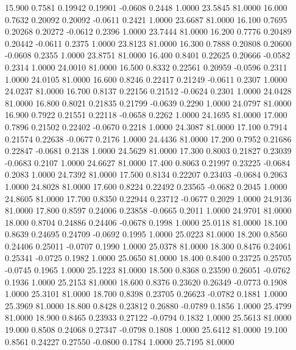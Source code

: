   15.900   0.7581   0.19942   0.19901  -0.0608   0.2448   1.0000  23.5845  81.0000
  16.000   0.7632   0.20092   0.20092  -0.0611   0.2421   1.0000  23.6687  81.0000
  16.100   0.7695   0.20268   0.20272  -0.0612   0.2396   1.0000  23.7444  81.0000
  16.200   0.7776   0.20489   0.20442  -0.0611   0.2375   1.0000  23.8123  81.0000
  16.300   0.7888   0.20808   0.20600  -0.0608   0.2355   1.0000  23.8751  81.0000
  16.400   0.8401   0.22625   0.20666  -0.0582   0.2314   1.0000  24.0010  81.0000
  16.500   0.8332   0.22561   0.20959  -0.0596   0.2311   1.0000  24.0105  81.0000
  16.600   0.8246   0.22417   0.21249  -0.0611   0.2307   1.0000  24.0237  81.0000
  16.700   0.8137   0.22156   0.21512  -0.0624   0.2301   1.0000  24.0428  81.0000
  16.800   0.8021   0.21835   0.21799  -0.0639   0.2290   1.0000  24.0797  81.0000
  16.900   0.7922   0.21551   0.22118  -0.0658   0.2262   1.0000  24.1695  81.0000
  17.000   0.7896   0.21502   0.22402  -0.0670   0.2218   1.0000  24.3087  81.0000
  17.100   0.7914   0.21574   0.22638  -0.0677   0.2176   1.0000  24.4436  81.0000
  17.200   0.7952   0.21686   0.22847  -0.0681   0.2138   1.0000  24.5629  81.0000
  17.300   0.8003   0.21827   0.23039  -0.0683   0.2107   1.0000  24.6627  81.0000
  17.400   0.8063   0.21997   0.23225  -0.0684   0.2083   1.0000  24.7392  81.0000
  17.500   0.8134   0.22207   0.23403  -0.0684   0.2063   1.0000  24.8028  81.0000
  17.600   0.8224   0.22492   0.23565  -0.0682   0.2045   1.0000  24.8605  81.0000
  17.700   0.8350   0.22944   0.23712  -0.0677   0.2029   1.0000  24.9136  81.0000
  17.800   0.8597   0.24006   0.23858  -0.0665   0.2011   1.0000  24.9701  81.0000
  18.000   0.8704   0.24886   0.24406  -0.0678   0.1998   1.0000  25.0118  81.0000
  18.100   0.8639   0.24695   0.24709  -0.0692   0.1995   1.0000  25.0223  81.0000
  18.200   0.8560   0.24406   0.25011  -0.0707   0.1990   1.0000  25.0378  81.0000
  18.300   0.8476   0.24061   0.25341  -0.0725   0.1982   1.0000  25.0650  81.0000
  18.400   0.8400   0.23725   0.25705  -0.0745   0.1965   1.0000  25.1223  81.0000
  18.500   0.8368   0.23590   0.26051  -0.0762   0.1936   1.0000  25.2153  81.0000
  18.600   0.8376   0.23620   0.26349  -0.0773   0.1908   1.0000  25.3101  81.0000
  18.700   0.8398   0.23705   0.26623  -0.0782   0.1881   1.0000  25.3969  81.0000
  18.800   0.8428   0.23812   0.26880  -0.0789   0.1856   1.0000  25.4799  81.0000
  18.900   0.8465   0.23933   0.27122  -0.0794   0.1832   1.0000  25.5613  81.0000
  19.000   0.8508   0.24068   0.27347  -0.0798   0.1808   1.0000  25.6412  81.0000
  19.100   0.8561   0.24227   0.27550  -0.0800   0.1784   1.0000  25.7195  81.0000
